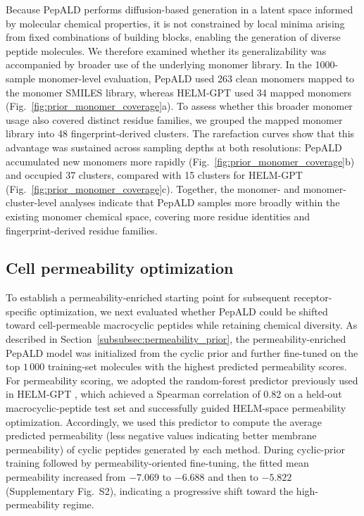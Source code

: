 Because PepALD performs diffusion-based generation in a latent space informed by molecular chemical properties, it is not constrained by local minima arising from fixed combinations of building blocks, enabling the generation of diverse peptide molecules.
We therefore examined whether its generalizability was accompanied by broader use of the underlying monomer library.
In the 1000-sample monomer-level evaluation, PepALD used 263 clean monomers mapped to the monomer SMILES library, whereas HELM-GPT used 34 mapped monomers (Fig.~\ref{fig:prior_monomer_coverage}a).
To assess whether this broader monomer usage also covered distinct residue families, we grouped the mapped monomer library into 48 fingerprint-derived clusters.
The rarefaction curves show that this advantage was sustained across sampling depths at both resolutions: PepALD accumulated new monomers more rapidly (Fig.~\ref{fig:prior_monomer_coverage}b) and occupied 37 clusters, compared with 15 clusters for HELM-GPT (Fig.~\ref{fig:prior_monomer_coverage}c).
Together, the monomer- and monomer-cluster-level analyses indicate that PepALD samples more broadly within the existing monomer chemical space, covering more residue identities and fingerprint-derived residue families.

\subsection{Cell permeability optimization}\label{subsec:permeability_optimization}

To establish a permeability-enriched starting point for subsequent receptor-specific optimization, we next evaluated whether PepALD could be shifted toward cell-permeable macrocyclic peptides while retaining chemical diversity.
As described in Section~\ref{subsubsec:permeability_prior}, the permeability-enriched PepALD model was initialized from the cyclic prior and further fine-tuned on the top $1\,000$ training-set molecules with the highest predicted permeability scores.
For permeability scoring, we adopted the random-forest predictor previously used in HELM-GPT \citep{ref_helm_gpt}, which achieved a Spearman correlation of 0.82 on a held-out macrocyclic-peptide test set and successfully guided HELM-space permeability optimization.
Accordingly, we used this predictor to compute the average predicted permeability (less negative values indicating better membrane permeability) of cyclic peptides generated by each method.
During cyclic-prior training followed by permeability-oriented fine-tuning, the fitted mean permeability increased from $-7.069$ to $-6.688$ and then to $-5.822$ (Supplementary Fig.~S2), indicating a progressive shift toward the high-permeability regime.

